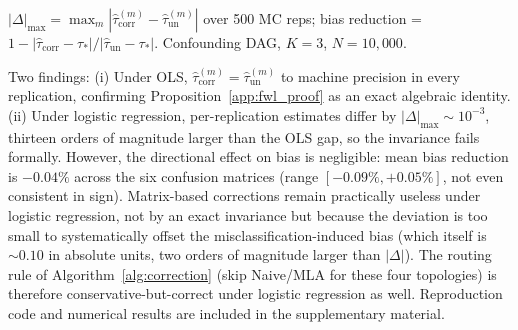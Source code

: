 $|\Delta|_{\max}=\max_m|\hat\tau_{\mathrm{corr}}^{(m)}-\hat\tau_{\mathrm{un}}^{(m)}|$ over 500 MC reps; bias reduction = $1-|\hat\tau_{\mathrm{corr}}-\tau_*|/|\hat\tau_{\mathrm{un}}-\tau_*|$. Confounding DAG, $K{=}3$, $N{=}10{,}000$.

\begin{table}[H]
\centering
\caption{FWL invariance under OLS vs.\ breakdown under logistic regression.}
\label{tab:fwl_logistic}
\end{table}

Two findings: (i) Under OLS, $\hat\tau_{\mathrm{corr}}^{(m)}=\hat\tau_{\mathrm{un}}^{(m)}$ to machine precision in every replication, confirming Proposition~\ref{app:fwl_proof} as an exact algebraic identity. (ii) Under logistic regression, per-replication estimates differ by $|\Delta|_{\max}\!\sim\!10^{-3}$, thirteen orders of magnitude larger than the OLS gap, so the invariance fails formally. However, the directional effect on bias is negligible: mean bias reduction is $-0.04\%$ across the six confusion matrices (range $[-0.09\%, +0.05\%]$, not even consistent in sign). Matrix-based corrections remain practically useless under logistic regression, not by an exact invariance but because the deviation is too small to systematically offset the misclassification-induced bias (which itself is $\sim\!0.10$ in absolute units, two orders of magnitude larger than $|\Delta|$). The routing rule of Algorithm~\ref{alg:correction} (skip Naive/MLA for these four topologies) is therefore conservative-but-correct under logistic regression as well. Reproduction code and numerical results are included in the supplementary material.

